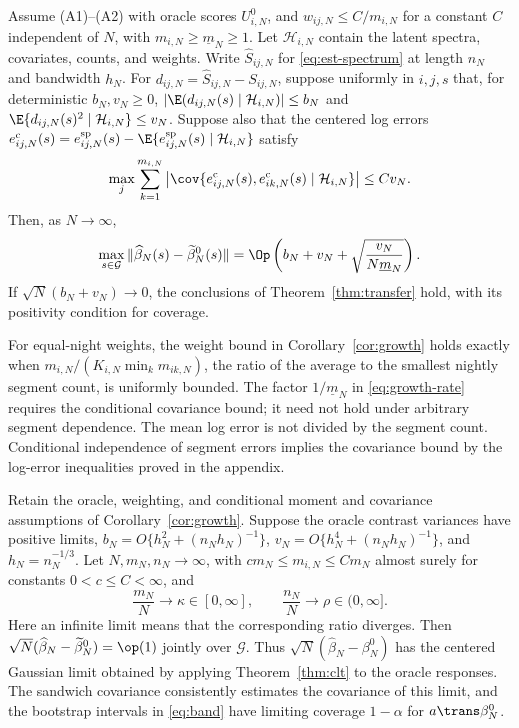 \begin{corollary}\label{cor:growth}
Assume (A1)--(A2) with oracle scores $U^0_{i,N}$, and $w_{ij,N}\leq C/m_{i,N}$ for a constant $C$ independent of $N$, with $m_{i,N}\geq\underline m_N\geq1$. Let $\mathcal H_{i,N}$ contain the latent spectra, covariates, counts, and weights. Write $\widehat S_{ij,N}$ for \eqref{eq:est-spectrum} at length $n_N$ and bandwidth $h_N$. For $d_{ij,N}=\widehat S_{ij,N}-S_{ij,N}$, suppose uniformly in $i,j,s$ that, for deterministic $b_N,v_N\geq0$,
$|\E(d_{ij,N}(s)\mid\mathcal H_{i,N})|\leq b_N$ and $\E\{d_{ij,N}(s)^2\mid\mathcal H_{i,N}\}\leq v_N$.
Suppose also that the centered log errors $e^{\mathrm{c}}_{ij,N}(s)=e^{\mathrm{sp}}_{ij,N}(s)-\E\{e^{\mathrm{sp}}_{ij,N}(s)\mid\mathcal H_{i,N}\}$ satisfy
\[
 \max_j\sum_{k=1}^{m_{i,N}}
 \left|\cov\{e^{\mathrm{c}}_{ij,N}(s),e^{\mathrm{c}}_{ik,N}(s)\mid\mathcal H_{i,N}\}\right|
 \leq Cv_N.
\]
Then, as $N\to\infty$,
\begin{equation}\label{eq:growth-rate}
 \max_{s\in\mathcal G}\|\widehat\beta_N(s)-\widetilde\beta_N^0(s)\|
 =\Op\left(b_N+v_N+\sqrt{\frac{v_N}{N\underline m_N}}\right).
\end{equation}
If $\sqrt N(b_N+v_N)\to0$, the conclusions of Theorem~\ref{thm:transfer} hold, with its positivity condition for coverage.
\end{corollary}

For equal-night weights, the weight bound in Corollary~\ref{cor:growth} holds exactly when $m_{i,N}/(K_{i,N}\min_k m_{ik,N})$, the ratio of the average to the smallest nightly segment count, is uniformly bounded. The factor $1/\underline m_N$ in \eqref{eq:growth-rate} requires the conditional covariance bound; it need not hold under arbitrary segment dependence. The mean log error is not divided by the segment count. Conditional independence of segment errors implies the covariance bound by the log-error inequalities proved in the appendix.

\begin{corollary}\label{cor:ratios}
Retain the oracle, weighting, and conditional moment and covariance assumptions of Corollary~\ref{cor:growth}. Suppose the oracle contrast variances have positive limits, $b_N=O\{h_N^2+(n_Nh_N)^{-1}\}$, $v_N=O\{h_N^4+(n_Nh_N)^{-1}\}$, and $h_N=n_N^{-1/3}$. Let $N,m_N,n_N\to\infty$, with $cm_N\leq m_{i,N}\leq Cm_N$ almost surely for constants $0<c\leq C<\infty$, and
\[
 \frac{m_N}{N}\to\kappa\in[0,\infty],
 \qquad
 \frac{n_N}{N}\to\rho\in(0,\infty].
\]
Here an infinite limit means that the corresponding ratio diverges. Then $\sqrt N(\widehat\beta_N-\widetilde\beta_N^0)=\op(1)$ jointly over $\mathcal G$. Thus $\sqrt N(\widehat\beta_N-\beta_N^0)$ has the centered Gaussian limit obtained by applying Theorem~\ref{thm:clt} to the oracle responses. The sandwich covariance consistently estimates the covariance of this limit, and the bootstrap intervals in \eqref{eq:band} have limiting coverage $1-\alpha$ for $a\trans\beta_N^0$.
\end{corollary}


